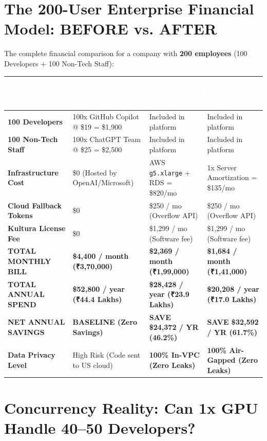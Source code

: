 \documentclass[10pt,a4paper]{article}
\begin{document}
\section{The 200-User Enterprise Financial Model: BEFORE vs. AFTER}

The complete financial comparison for a company with \textbf{200 employees} (100 Developers + 100 Non-Tech Staff):

\vspace{4pt}
\begin{tabularx}{\textwidth}{l X X X}
\toprule
\rowcolor{tableheader}
\textcolor{white}{\textbf{Cost Component}} & \textcolor{white}{\textbf{BEFORE: Commercial SaaS}} & \textcolor{white}{\textbf{AFTER: Kultura on AWS}} & \textcolor{white}{\textbf{AFTER: Kultura On-Prem}} \\
\midrule
\textbf{100 Developers} & 100x GitHub Copilot @ \$19 = \$1,900 & Included in platform & Included in platform \\
\rowcolor{tablerowalt}
\textbf{100 Non-Tech Staff} & 100x ChatGPT Team @ \$25 = \$2,500 & Included in platform & Included in platform \\
\textbf{Infrastructure Cost} & \$0 (Hosted by OpenAI/Microsoft) & AWS \texttt{g5.xlarge} + RDS = \$820/mo & 1x Server Amortization = \$135/mo \\
\rowcolor{tablerowalt}
\textbf{Cloud Fallback Tokens} & \$0 & \$250 / mo (Overflow API) & \$250 / mo (Overflow API) \\
\textbf{Kultura License Fee} & \$0 & \$1,299 / mo (Software fee) & \$1,299 / mo (Software fee) \\
\midrule
\textbf{TOTAL MONTHLY BILL} & \textbf{\$4,400 / month (₹3,70,000)} & \textbf{\$2,369 / month (₹1,99,000)} & \textbf{\$1,684 / month (₹1,41,000)} \\
\rowcolor{tablerowalt}
\textbf{TOTAL ANNUAL SPEND} & \textbf{\$52,800 / year (₹44.4 Lakhs)} & \textbf{\$28,428 / year (₹23.9 Lakhs)} & \textbf{\$20,208 / year (₹17.0 Lakhs)} \\
\midrule
\textbf{NET ANNUAL SAVINGS} & \textbf{BASELINE (Zero Savings)} & \textbf{SAVE \$24,372 / YR (46.2\%)} & \textbf{SAVE \$32,592 / YR (61.7\%)} \\
\rowcolor{tablerowalt}
\textbf{Data Privacy Level} & High Risk (Code sent to US cloud) & \textbf{100\% In-VPC (Zero Leaks)} & \textbf{100\% Air-Gapped (Zero Leaks)} \\
\bottomrule
\end{tabularx}

\section{Concurrency Reality: Can 1x GPU Handle 40--50 Developers?}
\end{document}
